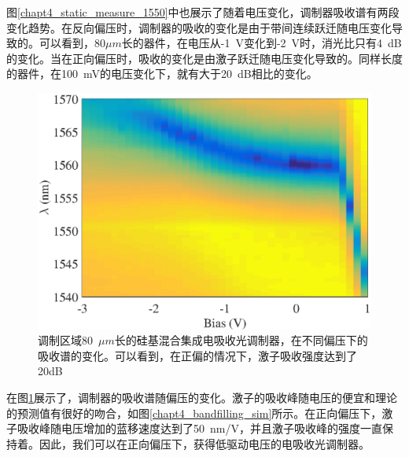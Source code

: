 图\ref{chapt4_static_measure_1550}中也展示了随着电压变化，调制器吸收谱有两段变化趋势。在反向偏压时，调制器的吸收的变化是由于带间连续跃迁随电压变化导致的。可以看到，80$\mu m$长的器件，在电压从-1~V变化到-2~V时，消光比只有4~dB的变化。当在正向偏压时，吸收的变化是由激子跃迁随电压变化导致的。同样长度的器件，在100~mV的电压变化下，就有大于20~dB相比的变化。

\begin{figure}[htb]
	\centering
	\includegraphics[width=14cm]{./Pictures/chapt4_static_measure_absorption_spectra.eps}
	\caption{调制区域80~$\mu m$长的硅基混合集成电吸收光调制器，在不同偏压下的吸收谱的变化。可以看到，在正偏的情况下，激子吸收强度达到了20dB}
	\label{chapt4_static_measure_absorption_spectra}
\end{figure}
在图\ref{chapt4_static_measure_absorption_spectra}展示了，调制器的吸收谱随偏压的变化。激子的吸收峰随电压的便宜和理论的预测值有很好的吻合，如图\ref{chapt4_bandfilling_sim}所示。在正向偏压下，激子吸收峰随电压增加的蓝移速度达到了50~nm/V，并且激子吸收峰的强度一直保持着。因此，我们可以在正向偏压下，获得低驱动电压的电吸收光调制器。

